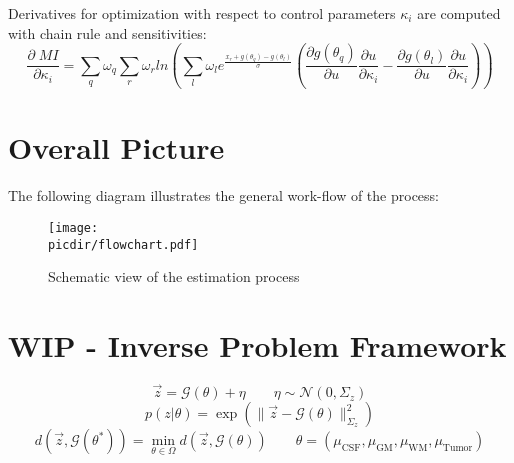 \documentclass{article}         %
\theoremstyle{definition}
\theoremstyle{remark}
\newcommand{\picdir}{pdffig/}
\begin{document}
Derivatives for optimization with respect to control parameters $\kappa_i$ are computed with chain rule and sensitivities:
\[
\frac{\partial \; MI}{\partial \kappa_i} = 
      \sum_q \omega_q \sum_r \omega_{r} ln \left( \sum_l \omega_l e^\frac{ x_r + g(\theta_q) - g(\theta_l)}{\sigma} 
       \left( \frac{\partial g(\theta_q)}{\partial u}\frac{\partial u}{\partial \kappa_i} 
           -  \frac{\partial g(\theta_l)}{\partial u}\frac{\partial u}{\partial \kappa_i} 
      \right) \right) 
\]



\section{Overall Picture}
The following diagram illustrates the general work-flow of the process:
\begin{figure}[h!!]
\center
\texttt{[image: \\picdir/flowchart.pdf]}
\caption{Schematic view of the estimation process}
\end{figure}

\section{WIP - Inverse Problem Framework}\label{InverseProbFramework}
\[
  \vec{z}  = \mathcal{G}(\theta) + \eta   \qquad   \eta \sim \mathcal{N}(0,\Sigma_z)
\]
\[
  p(z|\theta ) = \exp \left( \|\vec{z} -  \mathcal{G}(\theta)\|^2_{\Sigma_z} \right)
\]
\[
               d\left(\vec{z}, \mathcal{G}(\theta^*)\right) = 
   \min_{\theta \in \Omega} d\left(\vec{z}, \mathcal{G}(\theta)\right)
\qquad
\theta = \left(\mu_\text{CSF}, \mu_\text{GM}, \mu_\text{WM}, \mu_\text{Tumor} \right)
\]
\end{document}

